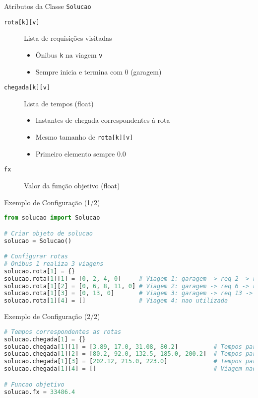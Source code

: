 \documentclass[10pt]{beamer}
\begin{document}
\begin{frame}{Atributos da Classe \texttt{Solucao}}
    \begin{description}
        \item[\texttt{rota[k][v]}] Lista de requisições visitadas
        \begin{itemize}
            \item Ônibus \texttt{k} na viagem \texttt{v}
            \item Sempre inicia e termina com 0 (garagem)
        \end{itemize}
        
        \vspace{0.3cm}
        
        \item[\texttt{chegada[k][v]}] Lista de tempos (float)
        \begin{itemize}
            \item Instantes de chegada correspondentes à rota
            \item Mesmo tamanho de \texttt{rota[k][v]}
            \item Primeiro elemento sempre 0.0
        \end{itemize}
        
        \vspace{0.3cm}
        
        \item[\texttt{fx}] Valor da função objetivo (float)
    \end{description}
\end{frame}

\begin{frame}[fragile]{Exemplo de Configuração (1/2)}
    \begin{lstlisting}[language=Python]
from solucao import Solucao

# Criar objeto de solucao
solucao = Solucao()

# Configurar rotas
# Onibus 1 realiza 3 viagens
solucao.rota[1] = {}
solucao.rota[1][1] = [0, 2, 4, 0]     # Viagem 1: garagem -> req 2 -> req 4 -> garagem
solucao.rota[1][2] = [0, 6, 8, 11, 0] # Viagem 2: garagem -> req 6 -> req 8 -> req 11 -> garagem
solucao.rota[1][3] = [0, 13, 0]       # Viagem 3: garagem -> req 13 -> garagem
solucao.rota[1][4] = []               # Viagem 4: nao utilizada
    \end{lstlisting}
\end{frame}

\begin{frame}[fragile]{Exemplo de Configuração (2/2)}
    \begin{lstlisting}[language=Python]
# Tempos correspondentes as rotas
solucao.chegada[1] = {}
solucao.chegada[1][1] = [3.89, 17.0, 31.08, 80.2]          # Tempos para rota[1][1]
solucao.chegada[1][2] = [80.2, 92.0, 132.5, 185.0, 200.2]  # Tempos para rota[1][2]
solucao.chegada[1][3] = [202.12, 215.0, 223.0]             # Tempos para rota[1][3]
solucao.chegada[1][4] = []                                 # Viagem nao utilizada

# Funcao objetivo
solucao.fx = 33486.4
    \end{lstlisting}
\end{frame}
\end{document}
